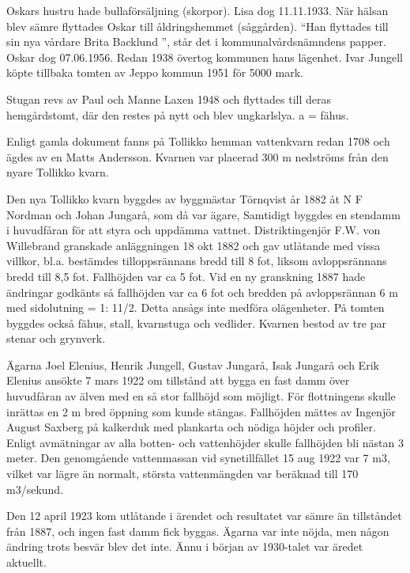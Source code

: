 Oskars hustru hade bullaförsäljning (skorpor). Lisa dog 11.11.1933. När hälsan blev sämre flyttades Oskar till åldringshemmet (såggården). ``Han flyttades till sin nya vårdare Brita Backlund '', står det i kommunalvårdsnämndens papper. Oskar dog 07.06.1956. Redan 1938 övertog kommunen hans lägenhet. Ivar Jungell köpte tillbaka tomten av Jeppo kommun 1951 för 5000 mark.

Stugan revs av Paul och Manne Laxen 1948 och flyttades till deras hemgårdstomt, där den restes på nytt och blev ungkarlslya. a = fähus.






Enligt gamla dokument fanns på Tollikko hemman vattenkvarn redan 1708 och ägdes av en Matts Andersson. Kvarnen var placerad 300 m nedströms från den nyare Tollikko kvarn.

Den nya Tollikko kvarn byggdes av byggmästar Törnqvist år 1882 åt N F Nordman och Johan Jungarå, som då var ägare, Samtidigt byggdes en stendamm i huvudfåran för att styra och uppdämma vattnet. Distriktingenjör F.W. 	von 	Willebrand granskade anläggningen 18 okt 1882 och gav utlåtande med vissa villkor, bl.a. bestämdes tilloppsrännans bredd till 8 fot, liksom avloppsrännans bredd till 8,5 fot. Fallhöjden var ca 5 fot. Vid en ny granskning 1887 hade ändringar	godkänts så fallhöjden var ca 6 fot och bredden på avloppsrännan 6 m med sidolutning = 1: 11/2. Detta ansågs inte medföra olägenheter. På tomten byggdes också fähus, stall, kvarnstuga och vedlider. Kvarnen bestod av tre par stenar och grynverk.

Ägarna Joel Elenius, Henrik Jungell, Gustav Jungarå, Isak Jungarå och Erik Elenius ansökte 7 mars 1922 om tillstånd att bygga en fast damm över huvudfåran av älven med en så stor fallhöjd som möjligt. För flottningens skulle inrättas en 2 m bred öppning som kunde stängas. Fallhöjden mättes av Ingenjör August Saxberg på kalkerduk med plankarta och nödiga höjder och profiler. Enligt avmätningar av alla botten- och vattenhöjder skulle fallhöjden bli nästan 3 meter. Den genomgående vattenmassan vid synetillfället 15 aug 1922 var 7 m3, vilket var lägre än normalt, största vattenmängden var beräknad till 170 m3/sekund.

Den 12 april 1923 kom utlåtande i ärendet och resultatet var sämre än tillståndet från 1887, och ingen fast damm fick byggas. Ägarna var inte nöjda, men någon ändring trots besvär blev det inte. Ännu i början av 1930-talet var äredet aktuellt.

